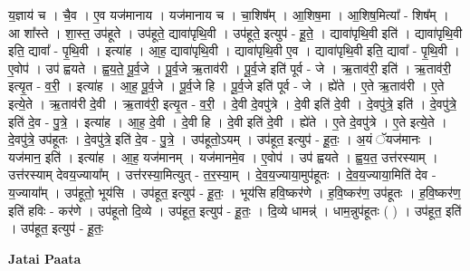\documentclass[17pt]{extarticle}
\begin{document}
य॒ज्ञाय॑ च । चै॒व । ए॒व यज॑मानाय । यज॑मानाय च । चा॒शिष᳚म् । आ॒शिष॒मा । आ॒शिष॒मित्या᳚ - शिष᳚म् । आ शा᳚स्ते । शा॒स्त॒ उप॑हूते । उप॑हूते॒ द्यावा॑पृथि॒वी । उप॑हूते॒ इत्युप॑ - हू॒ते॒ । द्यावा॑पृथि॒वी इति॑ । द्यावा॑पृथि॒वी इति॒ द्यावा᳚ - पृ॒थि॒वी । इत्या॑ह । आ॒ह॒ द्यावा॑पृथि॒वी । द्यावा॑पृथि॒वी ए॒व । द्यावा॑पृथि॒वी इति॒ द्यावा᳚ - पृ॒थि॒वी । ए॒वोप॑ । उप॑ ह्वयते । ह्व॒य॒ते॒ पू॒र्व॒जे । पू॒र्व॒जे ऋ॒ताव॑री । पू॒र्व॒जे इति॑ पूर्व - जे । ऋ॒ताव॑री॒ इति॑ । ऋ॒ताव॑री॒ इत्यृ॒त - व॒री॒ । इत्या॑ह । आ॒ह॒ पू॒र्व॒जे । पू॒र्व॒जे हि । पू॒र्व॒जे इति॑ पूर्व - जे । ह्ये॑ते । ए॒ते ऋ॒ताव॑री । ए॒ते इत्ये॒ते । ऋ॒ताव॑री दे॒वी । ऋ॒ताव॑री॒ इत्यृ॒त - व॒री॒ । दे॒वी दे॒वपु॑त्रे । दे॒वी इति॑ दे॒वी । दे॒वपु॑त्रे॒ इति॑ । दे॒वपु॑त्रे॒ इति॑ दे॒व - पु॒त्रे॒ । इत्या॑ह । आ॒ह॒ दे॒वी । दे॒वी हि । दे॒वी इति॑ दे॒वी । ह्ये॑ते । ए॒ते दे॒वपु॑त्रे । ए॒ते इत्ये॒ते । दे॒वपु॑त्रे॒ उप॑हूतः । दे॒वपु॑त्रे॒ इति॑ दे॒व - पु॒त्रे॒ । उप॑हूतो॒ऽयम् । उप॑हूत॒ इत्युप॑ - हू॒तः॒ । अ॒यं ॅयज॑मानः । यज॑मान॒ इति॑ । इत्या॑ह । आ॒ह॒ यज॑मानम् । यज॑मानमे॒व । ए॒वोप॑ । उप॑ ह्वयते । ह्व॒य॒त॒ उत्त॑रस्याम् । उत्त॑रस्याम् देवय॒ज्याया᳚म् । उत्त॑रस्या॒मित्युत् - त॒र॒स्या॒म् । दे॒व॒य॒ज्याया॒मुप॑हूतः । दे॒व॒य॒ज्याया॒मिति॑ देव - य॒ज्याया᳚म् । उप॑हूतो॒ भूय॑सि । उप॑हूत॒ इत्युप॑ - हू॒तः॒ । भूय॑सि हवि॒ष्कर॑णे । ह॒वि॒ष्कर॑ण॒ उप॑हूतः । ह॒वि॒ष्कर॑ण॒ इति॑ हविः - कर॑णे । उप॑हूतो दि॒व्ये । उप॑हूत॒ इत्युप॑ - हू॒तः॒ । दि॒व्ये धामन्न्॑ । धाम॒न्नुप॑हूतः ( ) । उप॑हूत॒ इति॑ । उप॑हूत॒ इत्युप॑ - हू॒तः॒ \newline

\textbf{Jatai Paata} \newline
\end{document}
